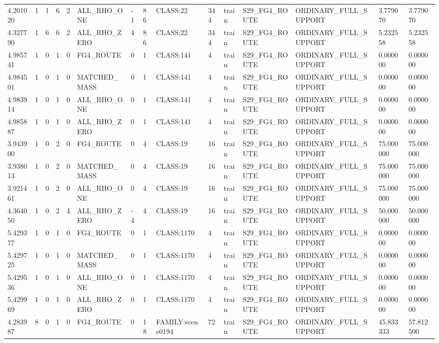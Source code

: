 \begin{tabular}{lllllllllllllll}
4.201020 & 1 & 1 & 6 & 2 & ALL\_RHO\_ONE & -1 & 86 & CLASS:22 & 344 & train & S29\_FG4\_ROUTE & ORDINARY\_FULL\_SUPPORT & 3.779070 & 3.779070 \\
4.327790 & 1 & 6 & 6 & 2 & ALL\_RHO\_ZERO & 4 & 86 & CLASS:22 & 344 & train & S29\_FG4\_ROUTE & ORDINARY\_FULL\_SUPPORT & 5.232558 & 5.232558 \\
4.985741 & 1 & 0 & 1 & 0 & FG4\_ROUTE & 0 & 1 & CLASS:141 & 4 & train & S29\_FG4\_ROUTE & ORDINARY\_FULL\_SUPPORT & 0.000000 & 0.000000 \\
4.984501 & 1 & 0 & 1 & 0 & MATCHED\_MASS & 0 & 1 & CLASS:141 & 4 & train & S29\_FG4\_ROUTE & ORDINARY\_FULL\_SUPPORT & 0.000000 & 0.000000 \\
4.983914 & 1 & 0 & 1 & 0 & ALL\_RHO\_ONE & 0 & 1 & CLASS:141 & 4 & train & S29\_FG4\_ROUTE & ORDINARY\_FULL\_SUPPORT & 0.000000 & 0.000000 \\
4.985887 & 1 & 0 & 1 & 0 & ALL\_RHO\_ZERO & 0 & 1 & CLASS:141 & 4 & train & S29\_FG4\_ROUTE & ORDINARY\_FULL\_SUPPORT & 0.000000 & 0.000000 \\
3.943900 & 1 & 0 & 2 & 0 & FG4\_ROUTE & 0 & 4 & CLASS:19 & 16 & train & S29\_FG4\_ROUTE & ORDINARY\_FULL\_SUPPORT & 75.000000 & 75.000000 \\
3.938013 & 1 & 0 & 2 & 0 & MATCHED\_MASS & 0 & 4 & CLASS:19 & 16 & train & S29\_FG4\_ROUTE & ORDINARY\_FULL\_SUPPORT & 75.000000 & 75.000000 \\
3.921461 & 1 & 0 & 2 & 0 & ALL\_RHO\_ONE & 0 & 4 & CLASS:19 & 16 & train & S29\_FG4\_ROUTE & ORDINARY\_FULL\_SUPPORT & 75.000000 & 75.000000 \\
4.364050 & 1 & 0 & 2 & 4 & ALL\_RHO\_ZERO & -4 & 4 & CLASS:19 & 16 & train & S29\_FG4\_ROUTE & ORDINARY\_FULL\_SUPPORT & 50.000000 & 50.000000 \\
5.429377 & 1 & 0 & 1 & 0 & FG4\_ROUTE & 0 & 1 & CLASS:1170 & 4 & train & S29\_FG4\_ROUTE & ORDINARY\_FULL\_SUPPORT & 0.000000 & 0.000000 \\
5.429725 & 1 & 0 & 1 & 0 & MATCHED\_MASS & 0 & 1 & CLASS:1170 & 4 & train & S29\_FG4\_ROUTE & ORDINARY\_FULL\_SUPPORT & 0.000000 & 0.000000 \\
5.429536 & 1 & 0 & 1 & 0 & ALL\_RHO\_ONE & 0 & 1 & CLASS:1170 & 4 & train & S29\_FG4\_ROUTE & ORDINARY\_FULL\_SUPPORT & 0.000000 & 0.000000 \\
5.429969 & 1 & 0 & 1 & 0 & ALL\_RHO\_ZERO & 0 & 1 & CLASS:1170 & 4 & train & S29\_FG4\_ROUTE & ORDINARY\_FULL\_SUPPORT & 0.000000 & 0.000000 \\
4.283987 & 8 & 0 & 1 & 0 & FG4\_ROUTE & 0 & 18 & FAMILY:scene0194 & 72 & train & S29\_FG4\_ROUTE & ORDINARY\_FULL\_SUPPORT & 45.833333 & 57.812500 \\

\end{tabular}
